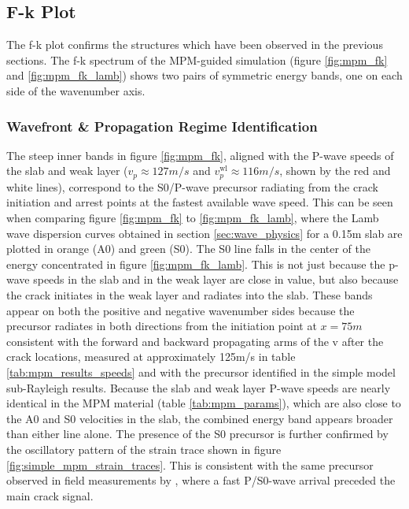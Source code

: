 \subsection{F-k Plot}
The f-k plot confirms the structures which have been observed in the previous sections. The f-k spectrum of the MPM-guided simulation (figure \ref{fig:mpm_fk} and \ref{fig:mpm_fk_lamb}) shows two pairs of symmetric energy bands, one on each side of the wavenumber axis.\par

\subsubsection{Wavefront \& Propagation Regime Identification}
The steep inner bands in figure \ref{fig:mpm_fk}, aligned with the P-wave speeds of the slab and weak layer ($v_p \approx 127m/s$ and $v_p^{\text{wl}} \approx 116 m/s$, shown by the red and white lines), correspond to the S0/P-wave precursor radiating from the crack initiation and arrest points at the fastest available wave speed. This can be seen when comparing figure \ref{fig:mpm_fk} to \ref{fig:mpm_fk_lamb}, where the Lamb wave dispersion curves obtained in section \ref{sec:wave_physics} for a 0.15m slab are plotted in orange (A0) and green (S0). The S0 line falls in the center of the energy concentrated in figure \ref{fig:mpm_fk_lamb}. This is not just because the p-wave speeds in the slab and in the weak layer are close in value, but also because the crack initiates in the weak layer and radiates into the slab. These bands appear on both the positive and negative wavenumber sides because the precursor radiates in both directions from the initiation point at $x = 75m $\, consistent with the forward and backward propagating arms of the v after the crack locations, measured at approximately 125m/s in table \ref{tab:mpm_results_speeds} and with the precursor identified in
the simple model sub-Rayleigh results. Because the slab and weak layer
P-wave speeds are nearly identical in the MPM material
(table \ref{tab:mpm_params}), which are also close to the A0 and S0 velocities in the slab, the combined energy band appears broader than either line alone. The presence of the S0 precursor is further confirmed by the oscillatory pattern of the strain trace shown in figure \ref{fig:simple_mpm_strain_traces}. This is consistent with the same precursor observed in field measurements by \textcite{herwijnenSeismicSensorArray2011}, where a fast P/S0-wave arrival preceded the main crack signal. \par


